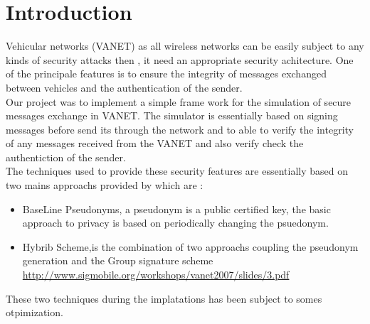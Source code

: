 \section{Introduction}
Vehicular networks  (VANET) as all wireless networks can be easily subject to any kinds of security  attacks  then , it need an appropriate security achitecture. One of the principale features is to ensure the integrity of messages exchanged between vehicles and the authentication of the sender.\\
Our project was to implement a simple frame work for the simulation of secure messages exchange in VANET. The simulator is essentially based on  signing  messages  before send its through the network and to able to verify  the integrity of any messages received from the VANET and also verify check the authentiction of the sender.\\
The techniques used to provide these security features are essentially based on two mains approachs provided by\cite{calandriello} which are :
\begin{itemize}
\item BaseLine Pseudonyms, a pseudonym is a public certified key,
the basic approach to privacy is based on periodically changing the psuedonym.
\item Hybrib Scheme,is the combination of two approachs coupling the pseudonym generation and the Group signature scheme
\\
\url{http://www.sigmobile.org/workshops/vanet2007/slides/3.pdf}
\end{itemize}
These two techniques during the implatations has been subject to somes otpimization.
\\
\\